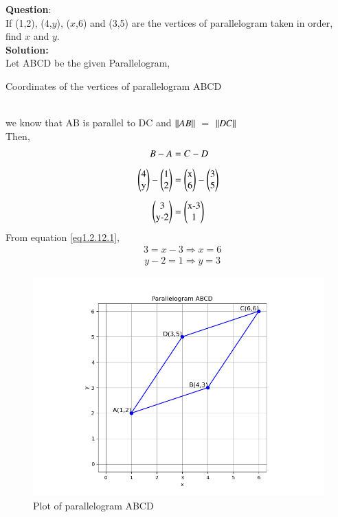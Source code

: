 \documentclass[journal]{IEEEtran}
\begin{document}
\textbf{Question}:\\If (1,2), (4,$y$), ($x$,6) and (3,5) are the vertices of parallelogram taken in order, find $x$ and $y$.
\\ \textbf{Solution:} \\ \hspace {0.5em} Let ABCD be the given Parallelogram, \\ 
\begin{table}[h!]
\centering
    \caption{Coordinates of the vertices of parallelogram ABCD}

\end{table}
 \\ we know that AB is parallel to DC and  $\left\vert\left\vert AB\right\vert\right\vert$ $=$ $\left\vert\left\vert DC\right\vert\right\vert$ \\ Then,
\begin{align}
B-A&=C-D\\[.5em]
\myvec{4 \\ $y$}-\myvec{1 \\ 2}&=\myvec{$x$ \\ 6}-\myvec{3 \\ 5}\\[0.5em] 
\myvec{3 \\ $y-2$}&=\myvec{$x-3$ \\ 1}\label{eq1.2.12.1} \end{align}
\hspace{8em} From equation\hspace{0.5em} \eqref{eq1.2.12.1}, \begin{align} &3=x-3	\Rightarrow x=6  \end{align} \begin{align} &y-2=1 \Rightarrow y=3\end{align}
\begin{figure}[h!]
   \centering \includegraphics[width=0.7\linewidth]{codes_figs/Figure_1.png}
   \caption{Plot of parallelogram ABCD}
   \label{Parallelogram}
\end{figure}
\end{document}
